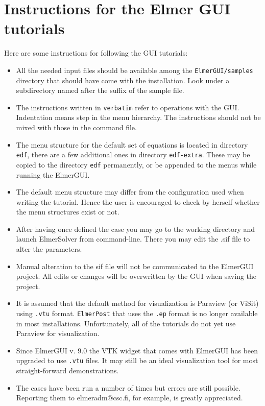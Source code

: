 \chapter*{Instructions for the Elmer GUI tutorials}

Here are some instructions for following the GUI tutorials:
\begin{itemize}
\item All the needed input files should be available among the \texttt{ElmerGUI/samples} 
  directory that should have come with the installation. Look under a subdirectory
  named after the suffix of the sample file.
%
\item The instructions written in \texttt{verbatim} refer to operations 
  with the GUI. Indentation means step in the menu hierarchy. 
  The instructions should not be mixed with those in the command file. 
%
\item The menu structure for the default set of equations is located 
  in directory \texttt{edf}, there are a few additional ones in 
  directory \texttt{edf-extra}. These may be copied to the directory \texttt{edf}
  permanently, or be appended to the menus while running the ElmerGUI. 
%
\item The default menu structure may differ from the configuration used
  when writing the tutorial. Hence the user is encouraged to check by herself 
  whether the menu structures exist or not. 
%
\item After having once defined the case you may go to the working directory 
  and launch ElmerSolver from command-line. There you may edit the .sif file 
  to alter the parameters.
%
\item Manual alteration to the sif file will not be communicated to the
  ElmerGUI project. All edits or changes will be overwritten by the GUI when saving the 
  project.
%
\item It is assumed that the default method for visualization is Paraview (or ViSit) using \texttt{.vtu} format.
  \texttt{ElmerPost} that uses the \texttt{.ep} format is no longer available in most installations.
  Unfortunately, all of the tutorials do not yet use Paraview for visualization.
  
\item Since ElmerGUI v. 9.0 the VTK widget that comes with
  ElmerGUI has been upgraded to use \texttt{.vtu} files. It may still be an ideal visualization tool
  for most straight-forward demonstrations.
%
\item The cases have been run a number of times but errors are still possible.
  Reporting them to elmeradm@csc.fi, for example, is greatly appreciated. 
  
\end{itemize}







